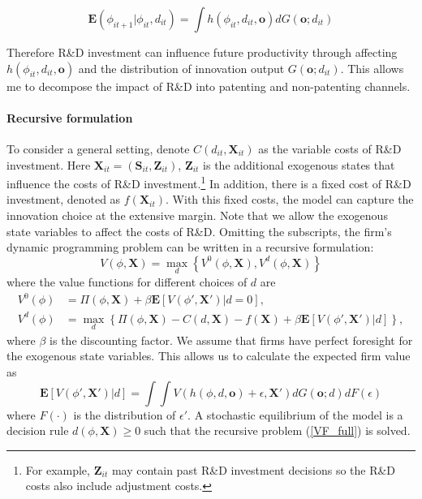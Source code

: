 \documentclass[11pt]{article}
\begin{document}
\begin{equation*}
    \mathbf{E}(\phi_{it+1}|\phi_{it}, d_{it})=\int h(\phi_{it},d_{it},\mathbf{o})dG(\mathbf{o};d_{it})
\end{equation*}

Therefore R\&D investment can influence future productivity through affecting $h(\phi_{it}, d_{it},\mathbf{o})$ and the distribution of innovation output $G(\mathbf{o}; d_{it})$. This allows me to decompose the impact of R\&D into patenting and non-patenting channels.


\paragraph{Recursive formulation}
To consider a general setting, denote $C(d_{it}, \mathbf{X}_{it})$ as the variable costs of R\&D investment. Here $\mathbf{X}_{it}=(\mathbf{S}_{it}, \mathbf{Z}_{it})$, $\mathbf{Z}_{it}$ is the additional exogenous states that influence the costs of R\&D investment.\footnote{For example, $\mathbf{Z}_{it}$ may contain past R\&D investment decisions so the R\&D costs also include adjustment costs.} In addition, there is a fixed cost of R\&D investment, denoted as $f(\mathbf{X}_{it})$. With this fixed costs, the model can capture the innovation choice at the extensive margin. Note that we allow the exogenous state variables to affect the costs of R\&D. Omitting the subscripts, the firm's dynamic programming problem can be written in a recursive formulation:
\begin{equation}\label{VF_full}
    V(\phi, \mathbf{X}) =\max_{d}\left\{V^0(\phi, \mathbf{X}), V^d(\phi, \mathbf{X})\right\} 
\end{equation}
where the value functions for different choices of $d$ are
\begin{align}
    V^0(\phi)&=\Pi(\phi,\mathbf{X})+ \beta \mathbf{E}\left[ V(\phi', \mathbf{X}')|d=0\right], \\
    V^d(\phi)&=\max_{d} \left\{ \Pi(\phi,\mathbf{X})-C(d, \mathbf{X}) - f(\mathbf{X}) + \beta \mathbf{E}\left[ V(\phi', \mathbf{X}')|d\right]\right\}, \label{VF_d}
\end{align}
where $\beta$ is the discounting factor. We assume that firms have perfect foresight for the exogenous state variables. This allows us to calculate the expected firm value as
\begin{equation}\label{EV_d}
    \mathbf{E}\left[ V(\phi', \mathbf{X}')|d\right] = \int\int V(h(\phi,d,\mathbf{o})+\epsilon,\mathbf{X}')dG(\mathbf{o};d)dF(\epsilon)
\end{equation}
where $F(\cdot)$ is the distribution of $\epsilon'$. 
A stochastic equilibrium of the model is a decision rule $d(\phi, \mathbf{X})\geq0$ such that the recursive problem (\ref{VF_full}) is solved.
\end{document}
